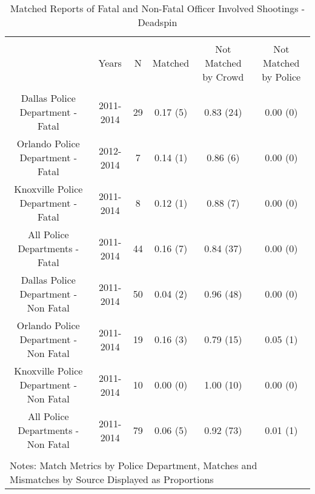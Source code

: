 
\begin{table}[!htbp] \centering 
  \caption{Matched Reports of Fatal and Non-Fatal Officer Involved Shootings - Deadspin} 
  \label{} 
\footnotesize 
\begin{tabular}{@{\extracolsep{5pt}} cccccc} 
\\[-1.8ex]\hline 
\hline \\[-1.8ex] 
 & Years & N & Matched & Not Matched by Crowd & Not Matched by Police \\ 
\hline \\[-1.8ex] 
Dallas Police Department - Fatal & 2011-2014 & 29 & 0.17 (5) & 0.83 (24) & 0.00 (0) \\ 
Orlando Police Department - Fatal & 2012-2014 & 7 & 0.14 (1) & 0.86 (6) & 0.00 (0) \\ 
Knoxville Police Department - Fatal & 2011-2014 & 8 & 0.12 (1) & 0.88 (7) & 0.00 (0) \\ 
All Police Departments - Fatal & 2011-2014 & 44 & 0.16 (7) & 0.84 (37) & 0.00 (0) \\ 
Dallas Police Department - Non Fatal & 2011-2014 & 50 & 0.04 (2) & 0.96 (48) & 0.00 (0) \\ 
Orlando Police Department - Non Fatal & 2011-2014 & 19 & 0.16 (3) & 0.79 (15) & 0.05 (1) \\ 
Knoxville Police Department - Non Fatal & 2011-2014 & 10 & 0.00 (0) & 1.00 (10) & 0.00 (0) \\ 
All Police Departments - Non Fatal & 2011-2014 & 79 & 0.06 (5) & 0.92 (73) & 0.01 (1) \\ 
\hline \\[-1.8ex] 
\multicolumn{6}{l}{Notes: Match Metrics by Police Department, Matches and Mismatches by Source Displayed as Proportions} \\ 
\end{tabular} 
\end{table}  
